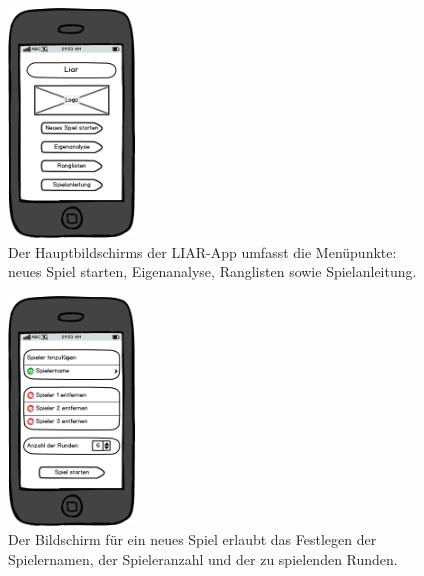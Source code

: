 \documentclass[10pt, a4paper, oneside, titlepage]{scrartcl} %
\begin{document}
	\begin{figure}[ht!]
		\begin{center}
			\includegraphics[width=0.3\textwidth]{mockup_01_index.png}
		\end{center}
		\caption[Mockup Hauptbildschirm]{Der Hauptbildschirms der LIAR-App umfasst die Menüpunkte: neues Spiel starten, Eigenanalyse, Ranglisten sowie Spielanleitung. }
		\label{fig:mockup_01}
	\end{figure}	


	\begin{figure}[ht!]
		\begin{center}
			\includegraphics[width=0.3\textwidth]{mockup_02_newgame.png}
		\end{center}
		\caption[Mockup Bildschirm für neues Spiel]{Der Bildschirm für ein neues Spiel erlaubt das Festlegen der Spielernamen, der Spieleranzahl und der zu spielenden Runden.}
		\label{fig:mockup_02}
	\end{figure}	
\end{document}
